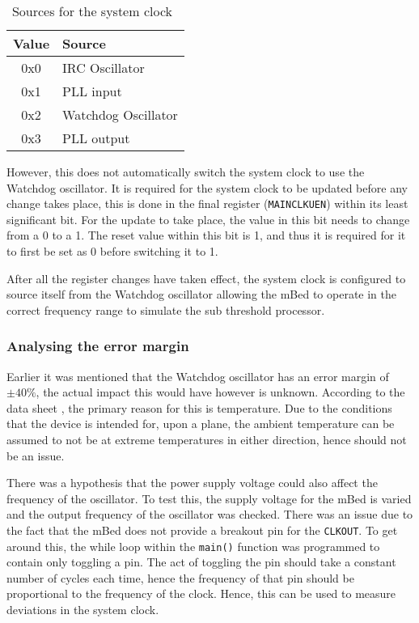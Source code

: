 \begin{table}
	\centering
	\begin{tabular}{|c|l|}
		\hline
		Value & Source \\
		\hline
		0x0 & IRC Oscillator \\
		0x1 & PLL input \\
		0x2 & Watchdog Oscillator \\
		0x3 & PLL output \\
		\hline
	\end{tabular}
	\caption{Sources for the system clock~\cite{mbed_datasheet}}
	\label{tab:sysclocksource}
\end{table}

However, this does not automatically switch the system clock to use the Watchdog oscillator. It is required for the system clock to be updated before any change takes place, this is done in the final register (\verb|MAINCLKUEN|) within its least significant bit. For the update to take place, the value in this bit needs to change from a 0 to a 1. The reset value within this bit is 1, and thus it is required for it to first be set as 0 before switching it to 1.

After all the register changes have taken effect, the system clock is configured to source itself from the Watchdog oscillator allowing the mBed to operate in the correct frequency range to simulate the sub threshold processor.

\subsubsection{Analysing the error margin}

Earlier it was mentioned that the Watchdog oscillator has an error margin of $ \pm 40\%$, the actual impact this would have however is unknown. According to the data sheet \cite{mbed_not_datasheet}, the primary reason for this is temperature. Due to the conditions that the device is intended for, upon a plane, the ambient temperature can be assumed to not be at extreme temperatures in either direction, hence should not be an issue.

There was a hypothesis that the power supply voltage could also affect the frequency of the oscillator. To test this, the supply voltage for the mBed is varied and the output frequency of the oscillator was checked. There was an issue due to the fact that the mBed does not provide a breakout pin for the \verb|CLKOUT|. To get around this, the while loop within the \verb|main()| function was programmed to contain only toggling a pin. The act of toggling the pin should take a constant number of cycles each time, hence the frequency of that pin should be proportional to the frequency of the clock. Hence, this can be used to measure deviations in the system clock.

